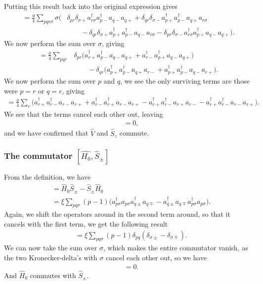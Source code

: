 \documentclass[a4paper, 11pt, notitlepage, english]{article}
\newcommand{\op}[1]{\hat{#1}}
\begin{document}
Putting this result back into the original expression gives
\begin{align*}
[\op{V}, \op{S}_z] = \frac{g}{4}\sum_{pqr\sigma} \sigma \big(&
\delta_{pr}\delta_{\sigma+} a_{r\sigma}^\dagger  a_{p-}^\dagger a_{q-}  a_{q+}
+ \delta_{qr}\delta_{\sigma-} a_{p+}^\dagger a_{p-}^\dagger a_{q+} a_{r\sigma}\\[-0.3cm]
&\qquad- \delta_{qr}\delta_{\sigma+} a_{p+}^\dagger a_{p-}^\dagger a_{q-} a_{r\sigma}  
- \delta_{pr} \delta_{\sigma -} a_{r\sigma}^\dagger  a_{p+}^\dagger a_{q-}  a_{q+} \big).
\end{align*}
We now perform the sum over $\sigma$, giving
\begin{align*}
[\op{V}, \op{S}_z] = \frac{g}{4}\sum_{pqr} &
\delta_{pr} \big(a_{r+}^\dagger  a_{p-}^\dagger a_{q-}  a_{q+} + a_{r-}^\dagger a_{p+}^\dagger a_{q-}  a_{q+} \big) \\[-0.3cm]
&\qquad - \delta_{qr} \big( a_{p+}^\dagger a_{p-}^\dagger a_{q+} a_{r-} + a_{p+}^\dagger a_{p-}^\dagger a_{q-} a_{r+} \big).
\end{align*}
We now perform the sum over $p$ and $q$, we see the only surviving terms are those were $p=r$ or $q=r$, giving
\begin{align*}
[\op{V}, \op{S}_z] = \frac{g}{4}\sum_{r} \big(
a_{r+}^\dagger  a_{r-}^\dagger a_{r-}  a_{r+} + a_{r-}^\dagger a_{r+}^\dagger a_{r-}  a_{r+}  -  a_{r+}^\dagger a_{r-}^\dagger a_{r+} a_{r-} - a_{r+}^\dagger a_{r-}^\dagger a_{r-} a_{r+} \big).
\end{align*}
We see that the terms cancel each other out, leaving
\begin{align*}
 [\op{V}, \op{S}_z] &= 0,
\end{align*}
and we have confirmed that $\op{V}$ and $\op{S}_z$ commute.

\subsubsection*{The commutator $[\op{H_0}, \op{S}_\pm]$}
From the definition, we have
\begin{align*}
[\op{H}_0, \op{S}_\pm] &= \op{H}_0\op{S}_\pm - \op{S}_\pm\op{H}_0 \\
&= 
\xi \sum_{pq \sigma} (p-1) \big( a_{p\sigma}^\dagger a_{p\sigma}  a_{q\pm}^\dagger a_{q\mp}       
- a_{q\pm}^\dagger a_{q\mp} a_{p\sigma}^\dagger a_{p\sigma}\big).
\end{align*}
Again, we shift the operators around in the second term around, so that it cancels with the first term, we get the following result
\begin{align*}
[\op{H}_0, \op{S}_\pm] &= \xi \sum_{pq \sigma} (p-1) \delta_{pq} (\delta_{\sigma \pm} - \delta_{\sigma \mp}).
\end{align*}
We can now take the sum over $\sigma$, which makes the entire commutator vanish, as the two Kronecker-delta's with $\sigma $ cancel each other out, so we have
\begin{align*}
[\op{H}_0, \op{S}_\pm] &= 0.
\end{align*}
And $\op{H}_0$ commutes with $\op{S}_\pm$.
\end{document}
